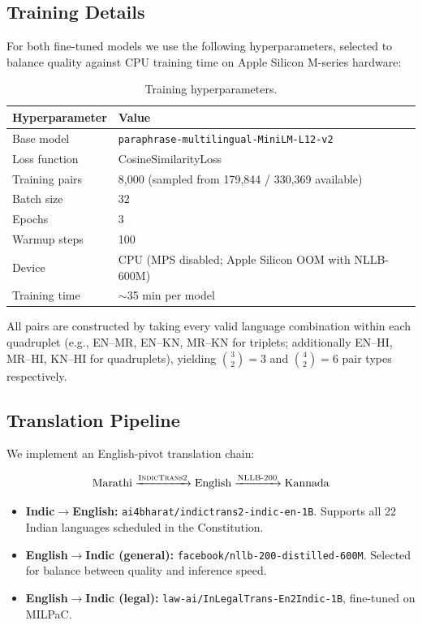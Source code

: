 \documentclass[11pt,a4paper]{article}
\begin{document}
\subsection{Training Details}
\label{sec:training}

For both fine-tuned models we use the following hyperparameters,
selected to balance quality against CPU training time on Apple
Silicon M-series hardware:

\begin{table}[H]
\centering
\caption{Training hyperparameters.}
\label{tab:hparams}
\begin{tabular}{ll}
\toprule
\textbf{Hyperparameter} & \textbf{Value} \\
\midrule
Base model & \texttt{paraphrase-multilingual-MiniLM-L12-v2} \\
Loss function & CosineSimilarityLoss \\
Training pairs & 8,000 (sampled from 179,844 / 330,369 available) \\
Batch size & 32 \\
Epochs & 3 \\
Warmup steps & 100 \\
Device & CPU (MPS disabled; Apple Silicon OOM with NLLB-600M) \\
Training time & $\sim$35 min per model \\
\bottomrule
\end{tabular}
\end{table}

All pairs are constructed by taking every valid language combination
within each quadruplet (e.g., EN--MR, EN--KN, MR--KN for triplets;
additionally EN--HI, MR--HI, KN--HI for quadruplets), yielding
$\binom{3}{2}=3$ and $\binom{4}{2}=6$ pair types respectively.

\subsection{Translation Pipeline}
\label{sec:translation}

We implement an English-pivot translation chain:

\[
\text{Marathi} \xrightarrow{\textsc{IndicTrans2}} \text{English}
\xrightarrow{\textsc{NLLB-200}} \text{Kannada}
\]

\begin{itemize}[leftmargin=*]
  \item \textbf{Indic$\rightarrow$English:} \texttt{ai4bharat/indictrans2-indic-en-1B}.
    Supports all 22 Indian languages scheduled in the Constitution.
  \item \textbf{English$\rightarrow$Indic (general):}
    \texttt{facebook/nllb-200-distilled-600M}.
    Selected for balance between quality and inference speed.
  \item \textbf{English$\rightarrow$Indic (legal):}
    \texttt{law-ai/InLegalTrans-En2Indic-1B}, fine-tuned on MILPaC.
\end{itemize}
\end{document}
